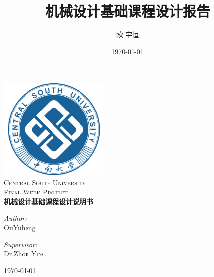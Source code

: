 \documentclass[12pt]{ctexart}
\title{机械设计基础课程设计报告}
\author{欧 宇恒}
\date{\today}
\begin{document}
	

    
\begin{titlepage}

    \begin{center}
    \includegraphics[width=0.4\textwidth]{./CSU.png}\\[1cm]    
    \textsc{\LARGE Central South University}\\[1.5cm]
    \textsc{\Large Final Week Project}\\[1.5cm]
    \textsc{\huge \bfseries 机械设计基础课程设计说明书}\\[1.5cm]
    \begin{minipage}{0.4\textwidth}
    \begin{flushleft} \large
    \emph{Author:}\\
    OuYuheng
    \end{flushleft}
    \end{minipage}
    \begin{minipage}{0.4\textwidth}
    \begin{flushright} \large
    \emph{Supervisor:} \\
    Dr.Zhou \textsc{Ying}
    \end{flushright}
    \end{minipage}
    
    \vfill
    
    {\large \today}
    
    \end{center}
    
    \end{titlepage}



\newpage

\tableofcontents
\end{document}
